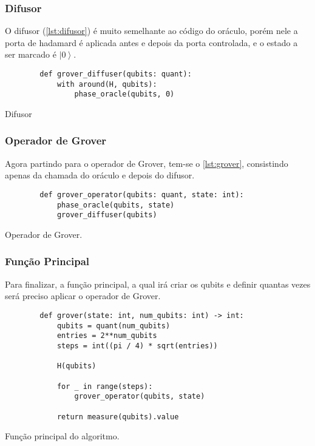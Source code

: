 \subsubsection{Difusor}\label{subsubsec:difusor2}

O difusor (\autoref{lst:difusor}) é muito semelhante ao código do oráculo, porém nele a porta de hadamard é aplicada antes e depois da porta controlada, e o estado a ser marcado é \(\left| 0 \right\rangle\).

\begin{listing}[!htb]
    \begin{verbatim}
        def grover_diffuser(qubits: quant):
            with around(H, qubits):
                phase_oracle(qubits, 0)
    \end{verbatim}
    \caption{Difusor}
    \label{lst:difusor}
\end{listing}

\subsubsection{Operador de Grover}\label{subsubsec:operador-de-grover}

Agora partindo para o operador de Grover, tem-se o \autoref{lst:grover}, consistindo apenas da chamada do oráculo e depois do difusor.

\begin{listing}[!htb]
    \begin{verbatim}
        def grover_operator(qubits: quant, state: int):
            phase_oracle(qubits, state)
            grover_diffuser(qubits)
    \end{verbatim}
    \caption{Operador de Grover.}
    \label{lst:grover}
\end{listing}


\subsubsection{Função Principal}\label{subsubsec:funcao-principal}

Para finalizar, a função principal, a qual irá criar os qubits e definir quantas vezes será preciso aplicar o operador de Grover.

\begin{listing}[!htb]
    \begin{verbatim}
        def grover(state: int, num_qubits: int) -> int:
            qubits = quant(num_qubits)
            entries = 2**num_qubits
            steps = int((pi / 4) * sqrt(entries))

            H(qubits)

            for _ in range(steps):
                grover_operator(qubits, state)

            return measure(qubits).value
    \end{verbatim}
    \caption{Função principal do algoritmo.}
    \label{lst:principal}
\end{listing}

